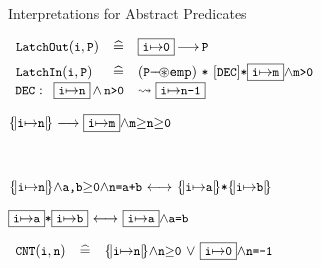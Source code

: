 \begin{frame}{Interpretations for Abstract Predicates}
\begin{small}
$
\begin{array}{lll}
\vspace{2mm}
 \LatchOut{i}{P} & \defs & \GLOBAL{i}{0} {\ourimply} \code{P}
\\
 \LatchIn{i}{P} &\defs &  (\code{P}{\septract}\emp) ~{\sep}~ [\DEC]  {\sep}\GLOBAL{i}{m} {\wedge}\code{m>0} 
 \\

\end{array}
$
$
\begin{array}{l}
\DEC: \begin{array}[t]{ll}
\GLOBAL{i}{n}\,{\wedge}\,\code{n{>}0} & \rightsquigarrow \GLOBAL{i}{n{-}1}
\end{array} \\
\end{array}\\
$
\end{small}
\pause
\vspace{2mm}
\begin{small}
$
\LOCAL{i}{n} \longrightarrow \GLOBALF{i}{m}{\code{m}{\geq}\code{n}{\geq}\code{0}}
$
\end{small} \\
\begin{small}
$
\LOCAL{i}{n}{\wedge}\code{a,b}{\geq}\code{0}{\wedge}{\code{n=a+b}}
~{\longleftrightarrow}~ \LOCAL{i}{a}{\sep}\LOCAL{i}{b} 
$
\end{small} 
\begin{small}
$
\GLOBAL{i}{a}{\sep}\GLOBAL{i}{b} 
~{\longleftrightarrow}~\GLOBAL{i}{a}{\wedge}\code{a{=}b}
$
\end{small}
\pause
\vspace{3mm}
\begin{small}
$
\begin{array}{lll}
\CNT{i}{n} &\defs & \LOCAL{i}{n} {\wedge}\code{n${\geq}$0}
~{\vee}~ \GLOBAL{i}{0}{\wedge}\code{n=-1} 
\end{array}
$
\end{small}

\end{frame}
